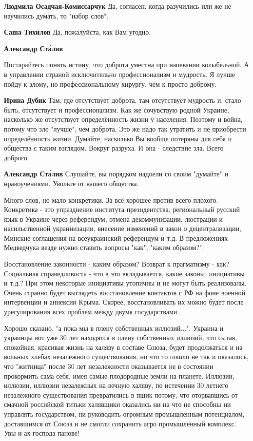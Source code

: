 \begin{itemize}
\begin{itemize}
\textbf{Людмила Осадчая-Комиссарчук} Да, согласен, когда разучились или же не научились думать, то "набор слов".

\textbf{Саша Тихилов} Да, пожалуйста, как Вам угодно.

\textbf{Александр Ста́лив} 

Постарайтесь понять истину, что доброта уместна при напевании колыбельной. А в
управлении страной исключительно профессионализм и мудрость. Я лучше пойду к
злому, но профессиональному хирургу, чем к просто доброму.

\textbf{Ирина Дубик} Там, где отсутствует доброта, там отсутствует мудрость и, стало быть, отсутствует и профессионализм.
Как же сочувствую родной Украине, насколько же отсутствует определённость жизни у населения. Поэтому и война, потому что зло "лучше", чем доброта. Это же надо так утратить и не приобрести определённость жизни.
Думайте, насколько Вы вообще потеряны для себя и общества с таким взглядом. Вокруг разруха. И она - следствие зла.
Всего доброго.

\textbf{Александр Ста́лив} Слушайте, вы порядком надоели со своим "думайте" и нравоучениями. Увольте от вашего общества.
\end{itemize} %


Много слов, но мало конкретики. За всё хорошее против всего плохого. Конкретика
- это упразднение института президентства, региональный русский язык в Украине
через референдум, отмена декоммунизации, люстрации и насильственной
украинизации, внесение изменений в закон о децентрализации, Минские соглашения
на всеукраинский референдум и т.д. В предложениях Медведчука везде нужно
ставить вопросы "как", "каким образом?".

Восстановление законности - каким образом? Возврат к прагматизму - как?
Социальная справедливость - что в это вкладывается, какие законы, инициативы и
т.д.? При этом некоторые инициативы утопичны и не могут быть реализованы. Очень
странно будет выглядеть восстановление контактов с РФ на фоне военной
интервенции и аннексии Крыма. Скорее, восстановливать их можно будет после
урегулирования всех проблем между двумя государствами.


Хорошо сказано, "а пока мы в плену собственных иллюзий...". Украина и украинцы
вот уже 30 лет находятся в плену собственных иллюзий, что сытая, спокойная,
красивая жизнь на халяву в составе Союза, будет продолжаться и на вольных
хлебах незалежного существования, но что то пошло не так и оказалось, что
"житница" после 30 лет незалежности оказывается не в состоянии прокормить сама
себя, имея самые плодородные земли на планете. Иллюзии, иллюзии, иллюзии
незалежных на вечную халяву, по истечении 30 летнего незалежного существования
превратились в пшик потому, что оторвавшись от смачной российской титьки
халявщики оказались ни на что не способны ни управлять государством, ни
руководить огромным промышленным потенциалом, доставшимся от Союза и не смогли
сохранить агро промышленный комплекс. Увы и ах господа панове!



\end{itemize}
